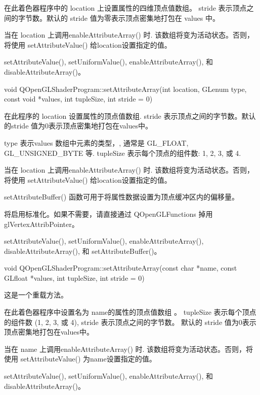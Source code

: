 在此着色器程序中的 location 上设置属性的四维顶点值数组。 stride 表示顶点之间的字节数。默认的 stride 值为零表示顶点密集地打包在 values 中。

当在 location 上调用enableAttributeArray() 时. 该数组将变为活动状态。否则，将使用 setAttributeValue() 给location设置指定的值。

\begin{seeAlso}
setAttributeValue(), setUniformValue(), enableAttributeArray(), 和 disableAttributeArray()。
\end{seeAlso}

void QOpenGLShaderProgram::setAttributeArray(int location, GLenum type, const void *values, int tupleSize, int stride = 0)

在此程序的 location 设置属性的顶点值数组. stride 表示顶点之间的字节数。默认的stride 值为0表示顶点密集地打包在values中。

type 表示values 数组中元素的类型，, 通常是 GL\_FLOAT, GL\_UNSIGNED\_BYTE 等. tupleSize 表示每个顶点的组件数: 1, 2, 3, 或 4.

当在 location 上调用enableAttributeArray() 时. 该数组将变为活动状态。否则，将使用 setAttributeValue() 给location设置指定的值。

setAttributeBuffer() 函数可用于将属性数据设置为顶点缓冲区内的偏移量。

\begin{notice}
将启用标准化。如果不需要，请直接通过 QOpenGLFunctions 掉用glVertexAttribPointer。
\end{notice}

\begin{seeAlso}
setAttributeValue(), setUniformValue(), enableAttributeArray(), disableAttributeArray(), 和 setAttributeBuffer()。
\end{seeAlso}

void QOpenGLShaderProgram::setAttributeArray(const char *name, const GLfloat *values, int tupleSize, int stride = 0)

这是一个重载方法。

在此着色器程序中设置名为 name的属性的顶点值数组 。 tupleSize 表示每个顶点的组件数 (1, 2, 3, 或 4), stride 表示顶点之间的字节数。 默认的 stride 值为0表示顶点密集地打包在values中。

当在 name 上调用enableAttributeArray() 时. 该数组将变为活动状态。否则，将使用 setAttributeValue() 为name设置指定的值。


\begin{seeAlso}
setAttributeValue(), setUniformValue(), enableAttributeArray(), 和 disableAttributeArray()。
\end{seeAlso}

